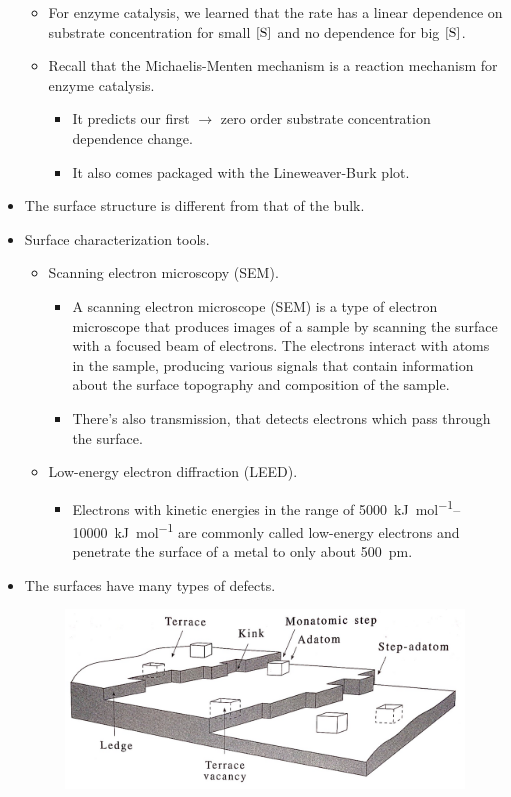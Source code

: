\documentclass[../notes.tex]{subfiles}
\begin{document}
\begin{itemize}
\begin{itemize}
        \item For enzyme catalysis, we learned that the rate has a linear dependence on substrate concentration for small $\cnc{S}$ and no dependence for big $\cnc{S}$.
        \item Recall that the Michaelis-Menten mechanism is a reaction mechanism for enzyme catalysis.
        \begin{itemize}
            \item It predicts our first $\to$ zero order substrate concentration dependence change.
            \item It also comes packaged with the Lineweaver-Burk plot.
        \end{itemize}
    \end{itemize}
    \item The surface structure is different from that of the bulk.
    \item Surface characterization tools.
    \begin{itemize}
        \item Scanning electron microscopy (SEM).
        \begin{itemize}
            \item A scanning electron microscope (SEM) is a type of electron microscope that produces images of a sample by scanning the surface with a focused beam of electrons. The electrons interact with atoms in the sample, producing various signals that contain information about the surface topography and composition of the sample.
            \item There's also transmission, that detects electrons which pass through the surface.
        \end{itemize}
        \item Low-energy electron diffraction (LEED).
        \begin{itemize}
            \item Electrons with kinetic energies in the range of \SIrange{5000}{10000}{\kilo\joule\per\mole} are commonly called low-energy electrons and penetrate the surface of a metal to only about \SI{500}{\pico\meter}.
        \end{itemize}
    \end{itemize}
    \item The surfaces have many types of defects.
    \begin{figure}[h!]
        \centering
        \includegraphics[width=0.6\linewidth]{../ExtFiles/surfaceDefects.png}

\end{figure}
\end{itemize}
\end{document}
